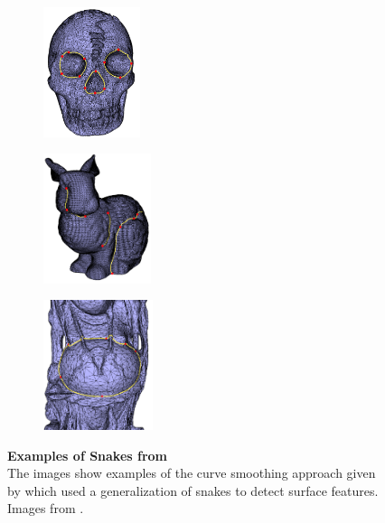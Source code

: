 \documentclass{stdlocal}
\begin{document}
\begin{figure}[b]
  \centering
  \begin{subfigure}[b]{0.32\linewidth}
    \centering
    \includegraphics[height=3.8cm]{images/lee2002-1.png}
  \end{subfigure}
  \begin{subfigure}[b]{0.32\linewidth}
    \centering
    \includegraphics[height=3.8cm]{images/lee2002-2.png}
  \end{subfigure}
  \begin{subfigure}[b]{0.32\linewidth}
    \centering
    \includegraphics[height=3.8cm]{images/lee2002-3.png}
  \end{subfigure}
  \caption[Examples of Snakes from \textcite{lee2002}]{%
    \textbf{Examples of Snakes from \textcite{lee2002}}\\
    The images show examples of the curve smoothing approach given by \textcite{lee2002} which used a generalization of snakes to detect surface features.
    Images from \textcite{lee2002}.
  }
  \label{fig:lee2002}
\end{figure}
\end{document}
